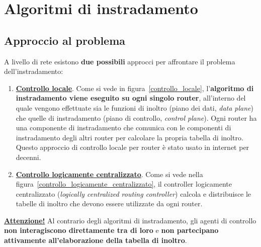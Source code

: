 \documentclass[a4paper]{article}
\begin{document}
	\section{Algoritmi di instradamento}
	
	\subsection{Approccio al problema}
	
	A livello di rete esistono \textbf{due possibili} approcci per affrontare il problema dell'instradamento:
	\begin{enumerate}
		\item \textcolor{Red3}{\textbf{\underline{Controllo locale}}}. Come si vede in figura~\ref{controllo_locale}, l’\textbf{algoritmo di instradamento viene eseguito su ogni singolo router}, all’interno del quale vengono effettuate sia le funzioni di inoltro (piano dei dati, \emph{data plane}) che quelle di instradamento (piano di controllo, \emph{control plane}). Ogni router ha una componente di instradamento che comunica con le componenti di instradamento degli altri router per calcolare la propria tabella di inoltro. Questo approccio di controllo locale per router è stato usato in internet per decenni.
		
		\item \textbf{\underline{Controllo logicamente centralizzato}}. Come si vede nella figura~\ref{controllo_logicamente_centralizzato}, il controller logicamente centralizzato (\emph{logically centralized routing controller}) calcola e distribuisce le tabelle di inoltro che devono essere utilizzate da ogni router.
	\end{enumerate}
	\textbf{\underline{Attenzione!}} Al contrario degli algoritmi di instradamento, gli agenti di controllo \textbf{non interagiscono direttamente tra di loro} e \textbf{non partecipano attivamente all’elaborazione della tabella di inoltro}.
\end{document}
